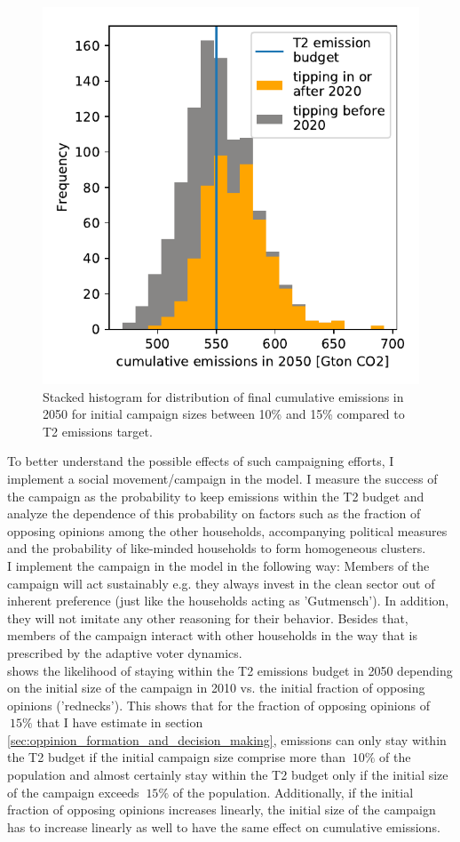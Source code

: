 \begin{figure}
	\vspace{-.4 cm}
        \hspace{-1.4 cm}
        \includegraphics[width = .57 \textwidth]{./figures/emissions_with_campaign.pdf}
        \caption{Stacked histogram for distribution of final cumulative emissions in 2050 for initial campaign sizes between 10\% and 15\% compared to T2 emissions target. \label{fig:campaign_sucess}}
\end{figure}

To better understand the possible effects of such campaigning efforts, I implement a social movement/campaign in the model. I measure the success of the campaign as the probability to keep emissions within the T2 budget and analyze the dependence of 
this probability on factors such as the fraction of opposing opinions among the other households, accompanying political measures and the probability of like-minded households to form homogeneous clusters.\\

I implement the campaign in the model in the following way: Members of the campaign will act sustainably e.g. they always invest in the clean sector out of inherent preference (just like the households acting as 'Gutmensch'). In addition, they will not imitate any other reasoning for their behavior. Besides that, members of the campaign interact with other households in the way that is prescribed by the adaptive voter dynamics.\\
 shows the likelihood of staying within the T2 emissions budget in 2050 depending on the initial size of the campaign in 2010 vs. the initial fraction of opposing opinions ('rednecks'). This shows that for the fraction of opposing opinions of $~15\%$ that I have estimate in section \ref{sec:oppinion_formation_and_decision_making}, emissions can only stay within the T2 budget if the initial campaign size comprise more than $~10\%$ of the population and almost certainly stay within the T2 budget only if the initial size of the campaign exceeds $~15\%$ of the population. Additionally, if the initial fraction of opposing opinions increases linearly, the initial size of the campaign has to increase linearly as well to have the same effect on cumulative emissions.\\

